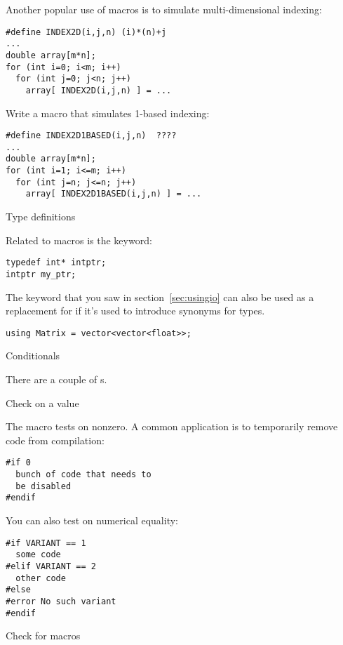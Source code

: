 Another popular use of macros is to simulate multi-dimensional indexing:
\begin{lstlisting}
#define INDEX2D(i,j,n) (i)*(n)+j
...
double array[m*n];
for (int i=0; i<m; i++)
  for (int j=0; j<n; j++)
    array[ INDEX2D(i,j,n) ] = ...
\end{lstlisting}

\begin{exercise}
  Write a macro that simulates 1-based indexing:
\begin{lstlisting}
#define INDEX2D1BASED(i,j,n)  ????
...
double array[m*n];
for (int i=1; i<=m; i++)
  for (int j=n; j<=n; j++)
    array[ INDEX2D1BASED(i,j,n) ] = ...
\end{lstlisting}
\end{exercise}


 {Type definitions}

Related to macros is the  keyword:
\begin{lstlisting}
typedef int* intptr;
intptr my_ptr;
\end{lstlisting}

The  keyword that you saw in section~\ref{sec:usingio}
can also be used as a replacement for  
if it's used to introduce synonyms for types.
\begin{lstlisting}
using Matrix = vector<vector<float>>;
\end{lstlisting}

 {Conditionals}


There are a couple of s.

 {Check on a value}

The  macro tests on nonzero. A common application is to
temporarily remove code from compilation:
\begin{lstlisting}
#if 0
  bunch of code that needs to
  be disabled
#endif
\end{lstlisting}

You can also test on numerical equality:
\begin{lstlisting}
#if VARIANT == 1
  some code
#elif VARIANT == 2
  other code
#else
#error No such variant
#endif
\end{lstlisting}

 {Check for macros}
\label{sec:cpp-ifdef}

